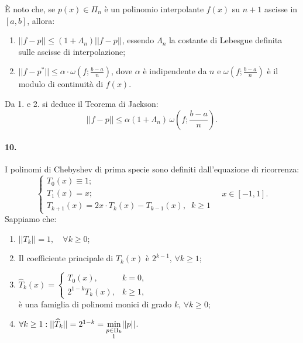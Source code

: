 \noindent È noto che, se $p(x)\in\Pi_n$ è un polinomio interpolante $f(x)$ su $n+1$ ascisse in $[a,b]$, allora:
\begin{enumerate}
    \item $||f-p||\leq (1+\Lambda_n)||f-p||$, essendo $\Lambda_n$ la costante di Lebesgue definita sulle ascisse di interpolazione;
    \item $||f-p^*||\leq \alpha\cdot\omega\left(f;\frac{b-a}{n}\right)$, dove $\alpha$ è indipendente da $n$ e $\omega\left(f;\frac{b-a}{n}\right)$ è il modulo di continuità di $f(x)$.\\
\end{enumerate}
Da 1. e 2. si deduce il Teorema di Jackson:
\begin{equation*}
    ||f-p||\leq\alpha(1+\Lambda_n)\,\omega\left(f;\frac{b-a}{n}\right).
\end{equation*}

\paragraph{10.} I polinomi di Chebyshev di prima specie sono definiti dall'equazione di ricorrenza:
\begin{equation*}
    \begin{cases}
        T_0(x) \equiv 1;\\
        T_1(x) = x;\\
        T_{k+1}(x) = 2x\cdot T_k(x)-T_{k-1}(x),\;\; k\geq 1
    \end{cases}\quad x\in[-1,1].
\end{equation*}
Sappiamo che:
\begin{enumerate}
    \item $||T_k||=1,\quad\forall k\geq 0$;
    \item Il coefficiente principale di $T_k(x)$ è $2^{k-1},\, \forall k\geq 1$;
    \item $\widehat T_k(x)=
    \begin{cases}
    T_0(x), &k=0,\\
    2^{1-k}T_k(x), &k\geq 1,
    \end{cases}$\\
    è una famiglia di polinomi monici di grado $k,\,\forall k\geq 0$;
    \item $\forall k\geq 1:||\widehat T_k||=2^{1-k}=\underset{\underset{\footnotemark}{p\in\Pi_k}}{\min}||p||$.
\end{enumerate}

